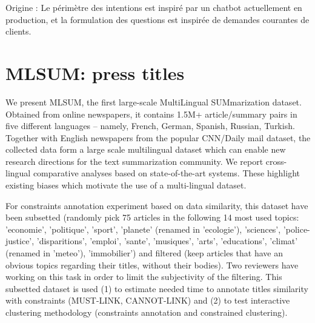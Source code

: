 		Origine : Le périmètre des intentions est inspiré par un chatbot actuellement en production, et la formulation des questions est inspirée de demandes courantes de clients.
	
    \section{MLSUM: press titles}
	\label{annex:C.2-DATASET-MLSUM-SUBSET-SCHILD}
	
		We present MLSUM, the first large-scale MultiLingual SUMmarization dataset.
		Obtained from online newspapers, it contains 1.5M+ article/summary pairs in five different languages -- namely, French, German, Spanish, Russian, Turkish. Together with English newspapers from the popular CNN/Daily mail dataset, the collected data form a large scale multilingual dataset which can enable new research directions for the text summarization community. We report cross-lingual comparative analyses based on state-of-the-art systems. These highlight existing biases which motivate the use of a multi-lingual dataset.
		
		For constraints annotation experiment based on data similarity, this dataset have been subsetted (randomly pick 75 articles in the following 14 most used topics: 'economie', 'politique', 'sport', 'planete' (renamed in 'ecologie'), 'sciences', 'police-justice', 'disparitions', 'emploi', 'sante', 'musiques', 'arts', 'educations', 'climat' (renamed in 'meteo'), 'immobilier') and filtered (keep articles that have an obvious topics regarding their titles, without their bodies). Two reviewers have working on this task in order to limit the subjectivity of the filtering. This subsetted dataset is used (1) to estimate needed time to annotate titles similarity with constraints (MUST-LINK, CANNOT-LINK) and (2) to test interactive clustering methodology (constraints annotation and constrained clustering).
